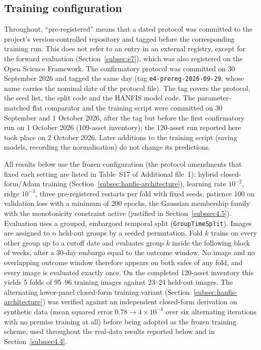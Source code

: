 \documentclass[referee,lineno,pdflatex,sn-basic]{sn-jnl}%
\theoremstyle{thmstyleone}%
\theoremstyle{thmstyletwo}%
\theoremstyle{thmstylethree}%
\begin{document}
\subsection{Training configuration}
\label{subssec4.2}
Throughout, ``pre-registered'' means that a dated protocol was committed to the project's version-controlled repository and tagged before the corresponding training run. This does not refer to an entry in an external registry, except for the forward evaluation (Section~\ref{subsec:e7}), which was also registered on the Open Science Framework. The confirmatory protocol was committed on 30 September 2026 and tagged the same day (tag \texttt{e4-prereg-2026-09-29}, whose name carries the nominal date of the protocol file). The tag covers the protocol, the seed list, the split code and the HANFIS model code. The parameter-matched flat comparator and the training script were committed on 30 September and 1 October 2026, after the tag but before the first confirmatory run on 1 October 2026 (109-asset inventory); the 120-asset run reported here took place on 2 October 2026. Later additions to the training script (saving models, recording the normalisation) do not change its predictions.

All results below use the frozen configuration (the protocol amendments that fixed each setting are listed in Table~S17 of Additional file~1): hybrid closed-form/Adam training
(Section~\ref{subsec:hanfis-architecture}), learning rate $10^{-2}$, ridge $10^{-3}$, three pre-registered
restarts per fold with fixed seeds, patience 100 on validation loss with a minimum of 200 epochs, the
Gaussian membership family with the monotonicity constraint active (justified in
Section~\ref{subssec4.5}). Evaluation uses a grouped, embargoed temporal split (\texttt{GroupTimeSplit}). Images are assigned to $n$ held-out groups by a seeded permutation. Fold $k$ trains on every other group up to a cutoff date and evaluates group $k$ inside the following block of weeks, after a 30-day embargo equal to the outcome window. No image and no overlapping outcome window therefore appears on both sides of any fold, and every image is evaluated exactly once. On the completed 120-asset inventory this
yields 5 folds of 95--96 training images against 23--24 held-out images. The alternating lower-panel
closed-form training variant (Section~\ref{subsec:hanfis-architecture}) was verified against an
independent closed-form derivation on synthetic data (mean squared error $0.78\to4\times10^{-4}$ over
six alternating iterations with no premise training at all) before being adopted as the frozen training scheme, used throughout the real-data results reported below and in
Section~\ref{subssec4.4}.
\end{document}
